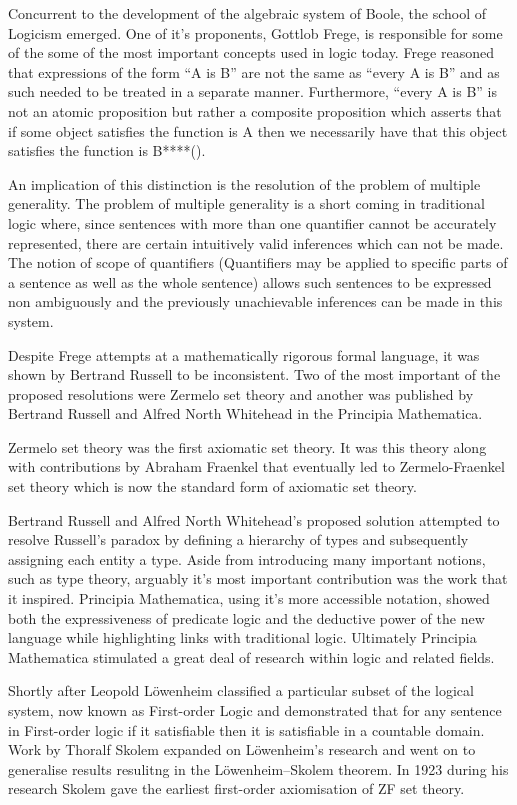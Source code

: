 Concurrent to the development of the algebraic system of Boole, the school of Logicism emerged. One of it's proponents,  Gottlob Frege, is responsible for some of the some of the most important concepts used in logic today. Frege reasoned that expressions of the form “A is B” are not the same as “every A is B” and as such needed to be treated in a separate manner. Furthermore, “every A is B” is not an atomic proposition but rather a composite proposition which asserts that if some object satisfies the function is A then we necessarily have that this object satisfies the function is B****(). 

An implication of this distinction is the resolution of the problem of multiple generality. The problem of multiple generality is a short coming in traditional logic where, since sentences with more than one quantifier cannot be accurately represented,  there are certain intuitively valid inferences which can not be made. The notion of scope of quantifiers (Quantifiers may be applied to specific parts of a sentence as well as the whole sentence) allows such sentences to be expressed non ambiguously and the previously unachievable inferences can be made in this system.

Despite Frege attempts at a mathematically rigorous formal language, it was shown by Bertrand Russell to be inconsistent.  Two of the most important of the proposed resolutions were Zermelo set theory and another was published by Bertrand Russell and Alfred North Whitehead in the Principia Mathematica.

Zermelo set theory was the first axiomatic set theory.  It was this theory along with contributions by Abraham Fraenkel that eventually led to Zermelo-Fraenkel set theory which is now the standard form of axiomatic set theory. \cite{cantone2001set}

Bertrand Russell and Alfred North Whitehead's proposed solution attempted to resolve Russell's paradox by defining a hierarchy of types and subsequently assigning each entity a type. Aside from introducing many important notions, such as type theory, arguably it's most important contribution was the work that it inspired. Principia Mathematica, using it's more accessible notation, showed both the expressiveness of predicate logic and the deductive power of the new language while highlighting links with traditional logic. Ultimately Principia Mathematica stimulated a great deal of research within logic and related fields. \cite{sep-principia-mathematica}

Shortly after Leopold L\"{o}wenheim classified a particular subset of the logical system, now known as First-order Logic and demonstrated that for any sentence in First-order logic if it satisfiable then it is satisﬁable in a countable domain. Work by Thoralf Skolem expanded on L\"{o}wenheim's research and went on to generalise results resulitng in the L\"{o}wenheim–Skolem theorem. In 1923 during his research Skolem gave the earliest first-order axiomisation of ZF set theory.\cite[p.~6]{KingShapiro95}

